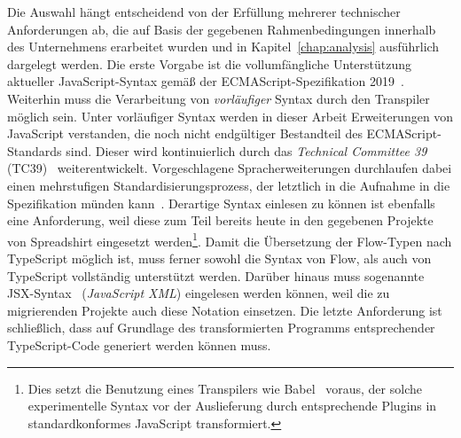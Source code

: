 Die Auswahl hängt entscheidend von der Erfüllung mehrerer technischer Anforderungen ab, die auf Basis der gegebenen Rahmenbedingungen innerhalb des Unternehmens erarbeitet wurden und in Kapitel~\ref{chap:analysis} ausführlich dargelegt werden. Die erste Vorgabe ist die vollumfängliche Unterstützung aktueller JavaScript-Syntax gemäß der ECMAScript-Spezifikation 2019~\autocite{ECMASCRIPT:2019}. Weiterhin muss die Verarbeitung von \emph{vorläufiger} Syntax durch den Transpiler möglich sein. Unter vorläufiger Syntax werden in dieser Arbeit Erweiterungen von JavaScript verstanden, die noch nicht endgültiger Bestandteil des ECMAScript-Standards sind. Dieser wird kontinuierlich durch das \textit{Technical Committee 39} (TC39)~\autocite{TC39_COMMITTEE} weiterentwickelt. Vorgeschlagene Spracherweiterungen durchlaufen dabei einen mehrstufigen Standardisierungsprozess, der letztlich in die Aufnahme in die Spezifikation münden kann~\autocite{TC39_PROCESS}. Derartige Syntax einlesen zu können ist ebenfalls eine Anforderung, weil diese zum Teil bereits heute in den gegebenen Projekte von Spreadshirt eingesetzt werden\footnote{Dies setzt die Benutzung eines Transpilers wie Babel~\autocite{BABEL} voraus, der solche experimentelle Syntax vor der Auslieferung durch entsprechende Plugins in standardkonformes JavaScript transformiert.}. Damit die Übersetzung der Flow-Typen nach TypeScript möglich ist, muss ferner sowohl die Syntax von Flow, als auch von TypeScript vollständig unterstützt werden. Darüber hinaus muss sogenannte JSX-Syntax~\autocite{SOFTWARE:JSX} (\textit{JavaScript XML}) eingelesen werden können, weil die zu migrierenden Projekte auch diese Notation einsetzen. Die letzte Anforderung ist schließlich, dass auf Grundlage des transformierten Programms entsprechender TypeScript-Code generiert werden können muss.



